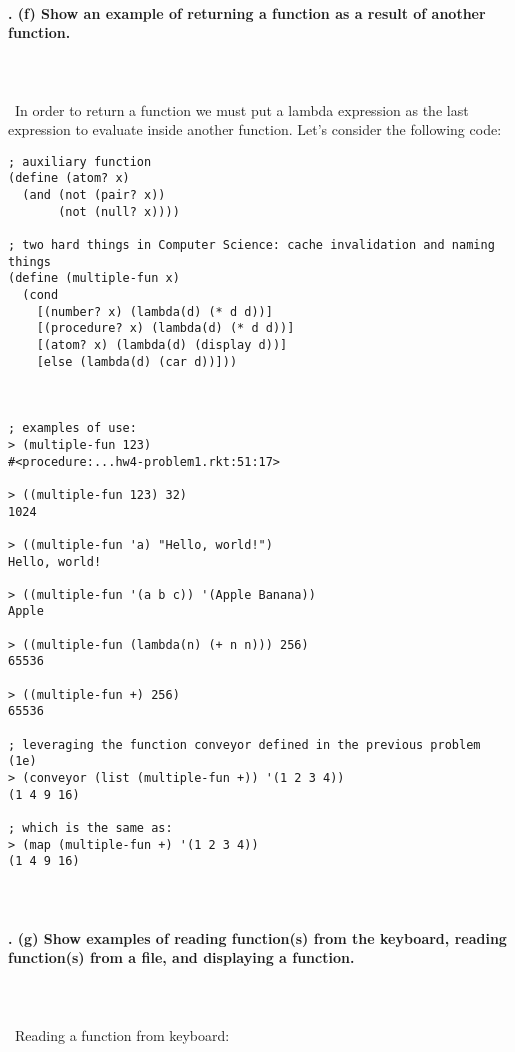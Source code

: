 \documentclass{article}
\begin{document}
\paragraph{. (f) Show an example of returning a function as a result of another function.}\
\paragraph{}\
In order to return a function we must put a lambda expression as the last expression to evaluate inside another function. Let's consider the following code:
\begin{verbatim}
; auxiliary function
(define (atom? x)
  (and (not (pair? x))
       (not (null? x))))   
 
; two hard things in Computer Science: cache invalidation and naming things
(define (multiple-fun x)
  (cond
    [(number? x) (lambda(d) (* d d))]
    [(procedure? x) (lambda(d) (* d d))]
    [(atom? x) (lambda(d) (display d))]
    [else (lambda(d) (car d))]))
    
    
    
; examples of use:
> (multiple-fun 123)
#<procedure:...hw4-problem1.rkt:51:17>

> ((multiple-fun 123) 32)
1024

> ((multiple-fun 'a) "Hello, world!")
Hello, world!

> ((multiple-fun '(a b c)) '(Apple Banana))
Apple

> ((multiple-fun (lambda(n) (+ n n))) 256)
65536

> ((multiple-fun +) 256)
65536

; leveraging the function conveyor defined in the previous problem (1e)
> (conveyor (list (multiple-fun +)) '(1 2 3 4))
(1 4 9 16) 

; which is the same as:
> (map (multiple-fun +) '(1 2 3 4))
(1 4 9 16)
\end{verbatim}

\paragraph{}\
\paragraph{. (g) Show examples of reading function(s) from the keyboard, reading function(s) from a file, and displaying a function.}\

\paragraph{}\
Reading a function from keyboard:
\end{document}
